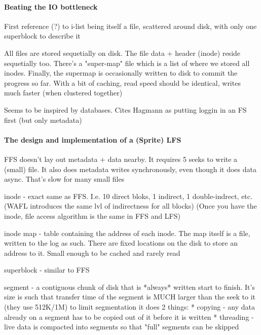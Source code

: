 \documentclass[a4paper]{report}
\begin{document}
        \paragraph{Beating the IO bottleneck}
        First reference (?) to i-list being itself a file, scattered around
        disk, with only one superblock to describe it

        All files are stored sequetially on disk. The file data + header
        (inode) reside sequetially too. There's a "super-map" file which is a
        list of where we stored all inodes. Finally, the supermap is
        occasionally written to disk to commit the progress so far. With a bit
        of caching, read speed should be identical, writes much faster (when
        clustered together)

        Seems to be inspired by databases. Cites Hagmann as putting loggin in
        an FS first (but only metadata)

        \paragraph{The design and implementation of a (Sprite) LFS}

        FFS doesn't lay out metadata + data nearby. It requires 5 seeks to
        write a (small) file. It also does metadata writes synchronously, even
        though it does data async. That's slow for many small files

        inode - exact same as FFS. I.e. 10 direct bloks, 1 indirect, 1
        double-indrect, etc. (WAFL introduces the same lvl of indirectness for
        all blocks) (Once you have the inode, file access algorithm is the same
        in FFS and LFS)

        inode map - table containing the address of each inode. The map itself
        is a file, written to the log as such. There are fixed locations on the
        disk to store an address to it. Small enough to be cached and rarely
        read

        superblock - similar to FFS

        segment - a contiguous chunk of disk that is *always* written start to
        finish. It's size is such that transfer time of the segment is MUCH
        larger than the seek to it (they use 512K/1M)
        to limit segmentation it does 2 things:
          * copying - any data already on a segment has to be copied out of it
            before it is written
          * threading - live data is compacted into segments so that "full"
            segments can be skipped
\end{document}
